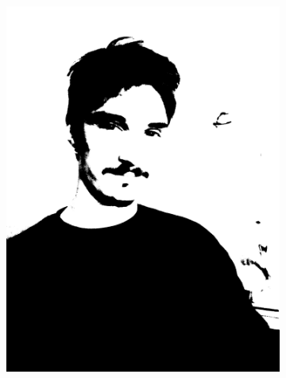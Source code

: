 \documentclass[12pt, a4paper]{article}
\begin{document}
\begin{figure}[!h]
\begin{subfigure}[b]{0.3\textwidth}
  \includegraphics[width=1\textwidth]{report_src/art/binary.jpeg}
\end{subfigure}
\end{figure}
\end{document}
